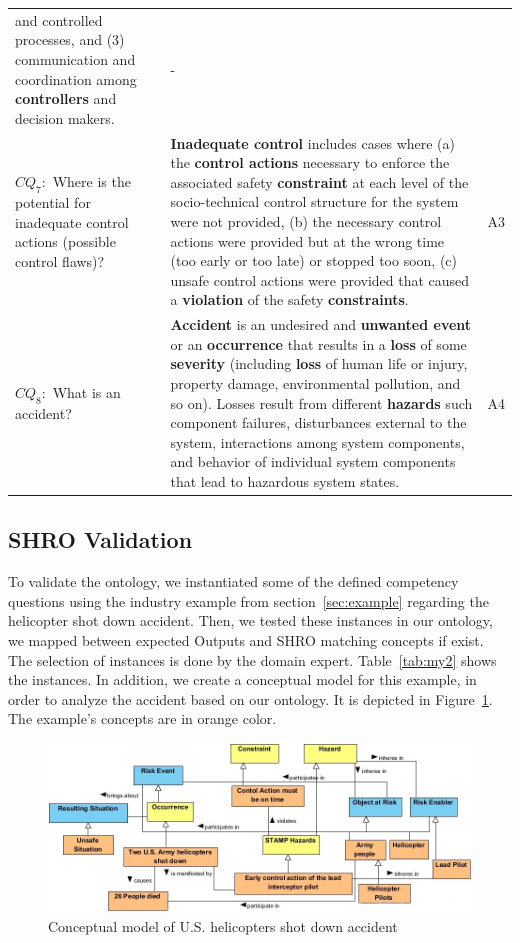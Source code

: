 \documentclass[sw]{iosart2x}
\begin{document}
\begin{table}
\begin{tabular}{|p{5cm}|p{8cm}|l|}
and controlled processes, and (3) communication and coordination among
\textbf{controllers} and decision makers.  & - \\
$CQ_7:$ Where is the potential for inadequate control actions (possible control flaws)? & \textbf{Inadequate control} includes cases where (a) the \textbf{control actions} necessary to enforce the associated safety \textbf{constraint} at each level of the socio-technical control structure for the system were not provided, (b) the necessary control actions were provided but at the wrong time (too early or too late) or stopped too soon, (c) unsafe control actions were provided that caused a \textbf{violation} of the safety \textbf{constraints}. & A3 \\
$CQ_8:$ What is an accident? &  \textbf{Accident} is an undesired and \textbf{unwanted event} or an \textbf{occurrence} that results in a \textbf{loss} of some \textbf{severity} (including \textbf{loss} of human life or injury, property damage, environmental pollution, and so on). Losses result from different \textbf{hazards} such component failures, disturbances external to the system, interactions among system components, and behavior of individual system components that lead to hazardous system states. & A4 \\
\hline
\end{tabular}
\end{table}

\subsection{SHRO Validation }
\label{Validation}
To validate the ontology, we instantiated some of the defined competency questions using the industry example from section~\ref{sec:example} regarding the helicopter shot down accident. Then, we tested these instances in our ontology, we mapped between expected Outputs and SHRO matching concepts if exist. The selection of instances is done by the domain expert. Table~\ref{tab:my2} shows the instances. In addition, we create a conceptual model for this example, in order to analyze the accident based on our ontology. It is depicted in Figure~\ref{fig:f3}. The example's concepts are in orange color.
 \begin{figure}
\begin{center}
\includegraphics[width=\textwidth]{hexample.jpg}
\end{center}
\caption{Conceptual model of U.S. helicopters shot down accident}
\label{fig:f3}
\end{figure}
\end{document}
